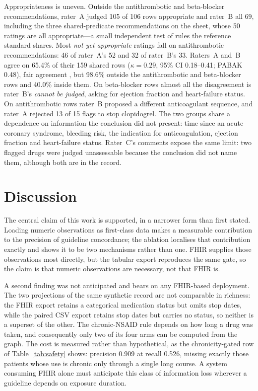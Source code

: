 \documentclass[conference]{IEEEtran}
\begin{document}
Appropriateness is uneven. Outside the antithrombotic and beta-blocker recommendations,
rater~A judged 105 of 106 rows appropriate and rater~B all 69, including the three
shared-predicate recommendations on the sheet, whose 50 ratings are all appropriate---a
small independent test of rules the reference standard shares. Most \emph{not yet
appropriate} ratings fall on antithrombotic recommendations: 46 of rater~A's 52 and 32 of
rater~B's 33. Raters~A and~B agree on 65.4\% of their 159 shared rows ($\kappa = 0.29$,
95\% CI 0.18--0.41; PABAK 0.48), fair agreement \cite{landis1977}, but 98.6\% outside the
antithrombotic and beta-blocker rows and 40.0\% inside them. On beta-blocker rows almost all
the disagreement is rater~B's \emph{cannot be judged}, asking for ejection fraction and
heart-failure status. On antithrombotic rows rater~B proposed a different anticoagulant
sequence, and rater~A rejected 13 of 15 flags to stop clopidogrel. The two groups share a
dependence on information the conclusion did not present: time since an acute coronary
syndrome, bleeding risk, the indication for anticoagulation, ejection fraction and
heart-failure status. Rater~C's comments expose the same limit: two flagged drugs were
judged unassessable because the conclusion did not name them, although both are in the
record.

\section{Discussion}

The central claim of this work is supported, in a narrower form than first stated. Loading
numeric observations as first-class data makes a measurable contribution to the precision of
guideline concordance; the ablation localises that contribution exactly and shows it to be
two mechanisms rather than one. FHIR supplies those observations most directly, but the
tabular export reproduces the same gate, so the claim is that numeric observations are
necessary, not that FHIR is.

A second finding was not anticipated and bears on any FHIR-based deployment. The two
projections of the same synthetic record are not comparable in richness: the FHIR export
retains a categorical medication status but omits stop dates, while the paired CSV export
retains stop dates but carries no status, so neither is a superset of the other. The
chronic-NSAID rule depends on how long a drug was taken, and consequently only two of its
four arms can be computed from the graph. The cost is measured rather than hypothetical, as
the chronicity-gated row of Table~\ref{tab:safety} shows: precision 0.909 at recall 0.526,
missing exactly those patients whose use is chronic only through a single long course. A
system consuming FHIR alone must anticipate this class of information loss wherever a
guideline depends on exposure duration.
\end{document}
